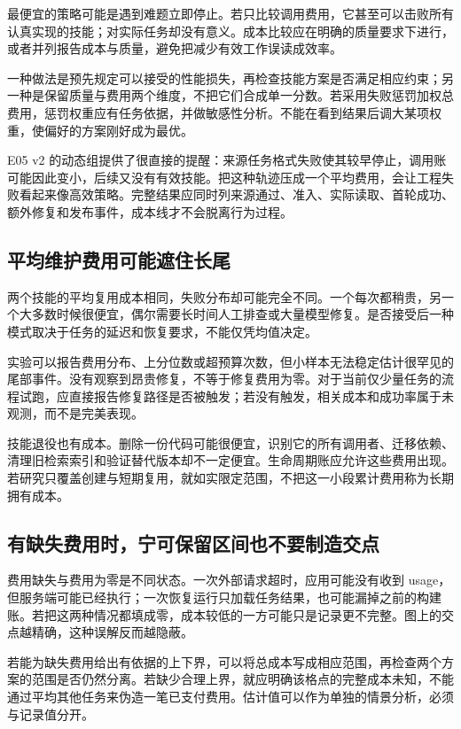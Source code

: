 最便宜的策略可能是遇到难题立即停止。若只比较调用费用，它甚至可以击败所有认真实现的技能；对实际任务却没有意义。成本比较应在明确的质量要求下进行，或者并列报告成本与质量，避免把减少有效工作误读成效率。

一种做法是预先规定可以接受的性能损失，再检查技能方案是否满足相应约束；另一种是保留质量与费用两个维度，不把它们合成单一分数。若采用失败惩罚加权总费用，惩罚权重应有任务依据，并做敏感性分析。不能在看到结果后调大某项权重，使偏好的方案刚好成为最优。

E05 v2 的动态组提供了很直接的提醒：来源任务格式失败使其较早停止，调用账可能因此变小，后续又没有有效技能。把这种轨迹压成一个平均费用，会让工程失败看起来像高效策略。完整结果应同时列来源通过、准入、实际读取、首轮成功、额外修复和发布事件，成本线才不会脱离行为过程。

\subsection{平均维护费用可能遮住长尾}

两个技能的平均复用成本相同，失败分布却可能完全不同。一个每次都稍贵，另一个大多数时候很便宜，偶尔需要长时间人工排查或大量模型修复。是否接受后一种模式取决于任务的延迟和恢复要求，不能仅凭均值决定。

实验可以报告费用分布、上分位数或超预算次数，但小样本无法稳定估计很罕见的尾部事件。没有观察到昂贵修复，不等于修复费用为零。对于当前仅少量任务的流程试跑，应直接报告修复路径是否被触发；若没有触发，相关成本和成功率属于未观测，而不是完美表现。

技能退役也有成本。删除一份代码可能很便宜，识别它的所有调用者、迁移依赖、清理旧检索索引和验证替代版本却不一定便宜。生命周期账应允许这些费用出现。若研究只覆盖创建与短期复用，就如实限定范围，不把这一小段累计费用称为长期拥有成本。

\subsection{有缺失费用时，宁可保留区间也不要制造交点}

费用缺失与费用为零是不同状态。一次外部请求超时，应用可能没有收到 usage，但服务端可能已经执行；一次恢复运行只加载任务结果，也可能漏掉之前的构建账。若把这两种情况都填成零，成本较低的一方可能只是记录更不完整。图上的交点越精确，这种误解反而越隐蔽。

若能为缺失费用给出有依据的上下界，可以将总成本写成相应范围，再检查两个方案的范围是否仍然分离。若缺少合理上界，就应明确该格点的完整成本未知，不能通过平均其他任务来伪造一笔已支付费用。估计值可以作为单独的情景分析，必须与记录值分开。


